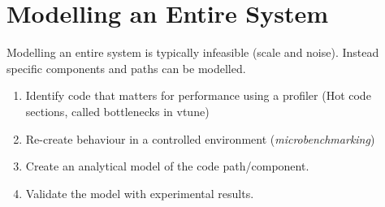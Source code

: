 \section{Modelling an Entire System}
Modelling an entire system is typically infeasible (scale and noise). Instead specific components and paths can be modelled.
\begin{enumerate}
    \item Identify code that matters for performance using a profiler (Hot code sections, called bottlenecks in vtune)
    \item Re-create behaviour in a controlled environment (\textit{microbenchmarking})
    \item Create an analytical model of the code path/component. 
    \item Validate the model with experimental results.
\end{enumerate}


